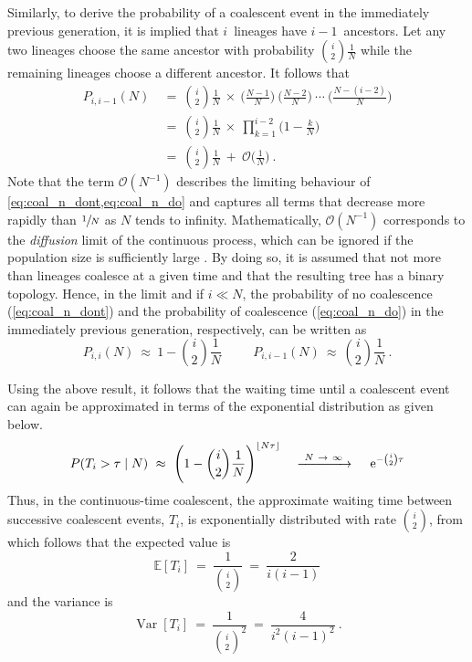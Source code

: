 Similarly, to derive the probability of a coalescent event in the immediately previous generation, it is implied that $i$~lineages have $i-1$~ancestors.
Let any two lineages choose the same ancestor with probability ${i \choose 2}\frac{1}{N}$ while the remaining lineages choose a different ancestor.
It follows that
\begin{equation}\label{eq:coal_n_do}
\begin{split}
	P_{i,i-1}(N)
	& ~=~ {i \choose 2} \frac{1}{N} ~\times~ \Big(\frac{N-1}{N}\Big) ~ \Big(\frac{N-2}{N}\Big) ~ \cdots ~ \Big(\frac{N-(i-2)}{N}\Big) \\
	& ~=~ {i \choose 2} \frac{1}{N} ~\times~ \prod_{k=1}^{i-2} \Big( 1 - \frac{k}{N} \Big) \\
	& ~=~ {i \choose 2} \frac{1}{N} ~+~ \mathcal{O}\Big( \frac{1}{N} \Big)
	\ \text{.}
\end{split}
\end{equation}
Note that the term ${\mathcal{O}(N^{-1})}$ describes the limiting behaviour of \cref{eq:coal_n_dont,eq:coal_n_do} and captures all terms that decrease more rapidly than $\sfrac{1}{N}$ as $N$ tends to infinity.
Mathematically, ${\mathcal{O}(N^{-1})}$ corresponds to the \emph{diffusion} limit of the continuous process, which can be ignored if the population size is sufficiently large \citep[\eg, see][]{wakeley2008}.
By doing so, it is assumed that not more than  lineages coalesce at a given time and that the resulting tree has a binary topology.
Hence, in the limit and if ${i \ll N}$, the probability of no coalescence ({\ref{eq:coal_n_dont}}) and the probability of coalescence ({\ref{eq:coal_n_do}}) in the immediately previous generation, respectively, can be written as
\begin{equation*}
	P_{i,i}(N) ~\approx~ 1 - {i \choose 2} \frac{1}{N} ~ \qquad ~
  P_{i,i-1}(N) ~\approx~ {i \choose 2} \frac{1}{N}
  \ \text{.}
\end{equation*}

Using the above result, it follows that the waiting time until a coalescent event can again be approximated in terms of the exponential distribution as given below.
\begin{equation}\label{eq:coal_n_approx}
	P(T_i > \tau \mid N)
	~\approx~ \Bigg( 1 - {i \choose 2} \frac{1}{N} \Bigg)^{\lfloor N \tau \rfloor}
	\quad \xrightarrow{~ N~\rightarrow~\infty ~} \quad
	\,\mathrm{e}^{-{i \choose 2}\tau}
\end{equation}
Thus, in the continuous-time coalescent, the approximate waiting time between successive coalescent events, $T_i$, is exponentially distributed with rate ${i \choose 2}$, from which follows that the expected value is
\begin{equation}\label{eq:coal_n_exp}
	\mathbb{E}[T_i] ~=~ \frac{1}{{i \choose 2}} ~=~ \frac{2}{i(i-1)}
\end{equation}
and the variance is
\begin{equation}\label{eq:coal_n_var}
	\operatorname{Var}[T_i] ~=~ \frac{1}{{i \choose 2}^2} ~=~ \frac{4}{i^2 (i-1)^2}
	\ .
\end{equation}

